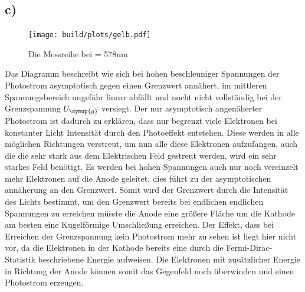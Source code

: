     \subsection{c)}

    \begin{figure}[H]
        \centering
        \texttt{[image: build/plots/gelb.pdf]}
        \caption{Die Messreihe bei \lambda = 578nm}
        \label{img:gelb}
    \end{figure}

    \noindent
    Das Diagramm beschreibt wie sich bei hohen beschleuniger Spannungen der Photostrom asymptotisch gegen einen Grenzwert annähert, im mittleren 
    Spannungsbereich ungefähr linear abfällt und nocht nicht vollständig bei der Grenzspannung $U_{\symup{g}}$ versiegt.
    Der nur asymptotisch angenäherter Photostrom ist dadurch zu erklären, dass nur begrenzt viele Elektronen bei konstanter Licht Intensität 
    durch den Photoeffekt entstehen. Diese werden in alle möglichen Richtungen verstreut, um nun alle diese Elektronen aufzufangen, auch die die sehr 
    stark aus dem Elektrischen Feld gestreut werden, wird ein sehr starkes Feld benötigt. Es werden bei hohen Spannungen auch nur noch vereinzelt
    mehr Elektronen auf die Anode geleitet, dies führt zu der asymptotischen annäherung an den Grenzwert. Somit wird der Grenzwert durch die 
    Intensität des Lichts bestimmt, um den Grenzwert bereits bei endlichen endlichen Spannungen zu erreichen müsste die Anode eine größere Fläche 
    um die Kathode am besten eine Kugelförmige Umschließung erreichen.
    Der Effekt, dass bei Erreichen der Grenzspannung kein Photostrom mehr zu sehen ist liegt hier nicht vor, da die Elektronen in der Kathode 
    bereits eine durch die Fermi-Dirac-Statistik beschriebene Energie aufweisen. Die Elektronen mit zusätzlicher Energie in Richtung der Anode 
    können somit das Gegenfeld noch überwinden und einen Photostrom erzeugen.

    

